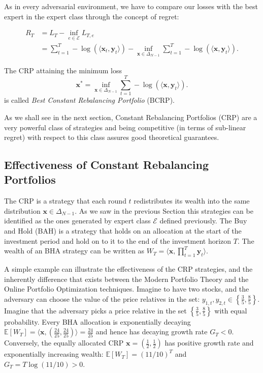 As in every adversarial environment, we have to compare our losses with the best expert in the expert class through the concept of regret:

\begin{align}
R_T&=L_T-\inf\limits_{e\in \mathcal E}L_{T,e}\\
&=\sum\limits_{t=1}^T-\log(\langle\mathbf x_t,\mathbf y_t\rangle)-\inf\limits_{\mathbf x\in\Delta_{N-1}}\sum\limits_{t=1}^T-\log(\langle\mathbf x,\mathbf y_t\rangle).
\end{align}

The CRP attaining the minimum loss 
$$\mathbf x^*=\inf\limits_{\mathbf x \in \Delta_{N-1}}\sum\limits_{t=1}^T-\log(\langle\mathbf x,\mathbf y_t\rangle).$$
is called \emph{Best Constant Rebalancing Portfolio} (BCRP).

As we shall see in the next section, Constant Rebalancing Portfolios (CRP) are a very powerful class of strategies and being competitive (in terms of sub-linear regret) with respect to this class assures good theoretical guarantees. 

\subsection{Effectiveness of Constant Rebalancing Portfolios}\label{sec:OPO}

The CRP is a strategy that each round $t$ redistributes its wealth into the same distribution $\mathbf x\in\Delta_{N-1}$. As we saw in the previous Section this strategies can be identified as the ones generated by expert class $\mathcal E$ defined previously.
The Buy and Hold (BAH) is a strategy that holds on an allocation at the start of the investment period and hold on to it to the end of the investment horizon $T$. The wealth of an BHA strategy can be written as $W_T=\langle\mathbf x, \prod_{t=1}^T \mathbf y_t\rangle$.

A simple example can illustrate the effectiveness of the CRP strategies, and the inherently difference that exists between the Modern Portfolio Theory and the Online Portfolio Optimization techniques.
Imagine to have two stocks, and the adversary can choose the value of the price relatives in the set: $y_{1,t},y_{2,t}\in\left\{\frac{3}{5},\frac{8}{5}\right\}$. Imagine that the adversary picks a price relative in the set $\left\{\frac{3}{5},\frac{8}{5}\right\}$ with equal probability. Every BHA allocation is exponentially decaying $\mathbb E[W_T]=\langle \mathbf x, (\frac{24}{25},\frac{24}{25})\rangle=\frac{24}{25}$ and hence has decaying growth rate $G_T<0$. Conversely, the equally allocated CRP $\mathbf x=(\frac{1}{2},\frac{1}{2})$ has positive growth rate and exponentially increasing wealth: $\mathbb E[W_T]=(11/10)^T$ and $G_T=T\log(11/10)>0$.

